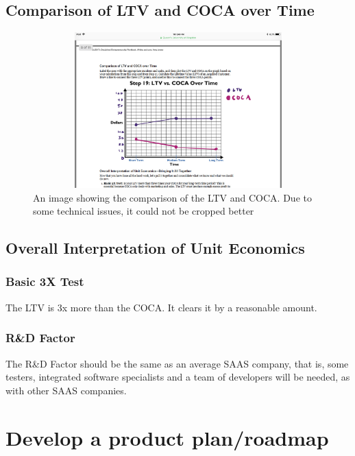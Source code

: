 \documentclass{article}
\begin{document}
    \subsection{Comparison of LTV and COCA over Time}
    \begin{figure}
        \begin{center}
            \includegraphics[width=12cm, height=6cm]{LTVCOCA}
            \caption{An image showing the comparison of the LTV and COCA. Due to some technical issues, it could not be cropped better}
        \end{center}
    \end{figure}
    \subsection{Overall Interpretation of Unit Economics}
        \subsubsection{Basic 3X Test}
        The LTV is 3x more than the COCA. It clears it by a reasonable amount.
        \subsubsection{R\&D Factor}
        The R\&D Factor should be the same as an average SAAS company, that is, some testers, integrated software specialists and a team of developers will be needed, as with other SAAS companies.

\section{Develop a product plan/roadmap}
    
\end{document}
